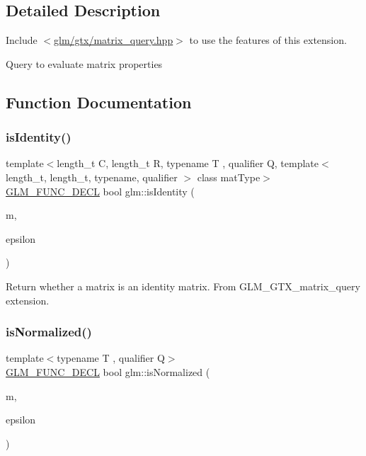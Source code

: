 \subsection{Detailed Description}
Include $<$\mbox{\hyperlink{matrix__query_8hpp}{glm/gtx/matrix\+\_\+query.\+hpp}}$>$ to use the features of this extension.

Query to evaluate matrix properties 

\subsection{Function Documentation}
\mbox{\label{group__gtx__matrix__query_gaee935d145581c82e82b154ccfd78ad91}} 
\subsubsection{\texorpdfstring{is\+Identity()}{isIdentity()}}
{\footnotesize\ttfamily template$<$length\+\_\+t C, length\+\_\+t R, typename T , qualifier Q, template$<$ length\+\_\+t, length\+\_\+t, typename, qualifier $>$ class mat\+Type$>$ \\
\mbox{\hyperlink{setup_8hpp_ab2d052de21a70539923e9bcbf6e83a51}{G\+L\+M\+\_\+\+F\+U\+N\+C\+\_\+\+D\+E\+CL}} bool glm\+::is\+Identity (\begin{DoxyParamCaption}\item[{mat\+Type$<$ C, R, T, Q $>$ const \&}]{m,  }\item[{T const \&}]{epsilon }\end{DoxyParamCaption})}

Return whether a matrix is an identity matrix. From G\+L\+M\+\_\+\+G\+T\+X\+\_\+matrix\+\_\+query extension. \mbox{\label{group__gtx__matrix__query_gae785af56f47ce220a1609f7f84aa077a}} 
\subsubsection{\texorpdfstring{is\+Normalized()}{isNormalized()}\hspace{0.1cm}{\footnotesize\ttfamily [1/3]}}
{\footnotesize\ttfamily template$<$typename T , qualifier Q$>$ \\
\mbox{\hyperlink{setup_8hpp_ab2d052de21a70539923e9bcbf6e83a51}{G\+L\+M\+\_\+\+F\+U\+N\+C\+\_\+\+D\+E\+CL}} bool glm\+::is\+Normalized (\begin{DoxyParamCaption}\item[{\mbox{\hyperlink{structglm_1_1mat}{mat}}$<$ 2, 2, T, Q $>$ const \&}]{m,  }\item[{T const \&}]{epsilon }\end{DoxyParamCaption})}

